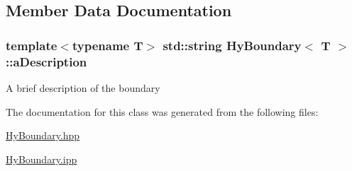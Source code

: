 \subsection{Member Data Documentation}
\hypertarget{classHyBoundary_a0eeb51edf5863746b1f7dbc12c61b1c6}{
\subsubsection[{aDescription}]{\setlength{\rightskip}{0pt plus 5cm}template$<$typename T$>$ std::string {\bf HyBoundary}$<$ T $>$::{\bf aDescription}}}
\label{classHyBoundary_a0eeb51edf5863746b1f7dbc12c61b1c6}
A brief description of the boundary 

The documentation for this class was generated from the following files:\begin{DoxyCompactItemize}
\item 
\hyperlink{HyBoundary_8hpp}{HyBoundary.hpp}\item 
\hyperlink{HyBoundary_8ipp}{HyBoundary.ipp}\end{DoxyCompactItemize}

